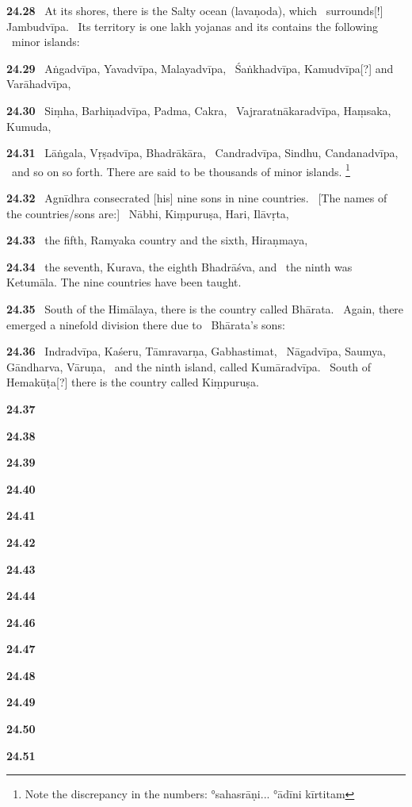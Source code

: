 \documentclass{article}
\begin{document}
\textbf{24.28}%
\ At its shores, there is the Salty ocean (lavaṇoda), which%
\              surrounds[!] Jambudvīpa.%
\ Its territory is one lakh yojanas and its contains the following%
\              minor islands:%


\textbf{24.29}%
\ Aṅgadvīpa, Yavadvīpa, Malayadvīpa,%
\ Śaṅkhadvīpa, Kamudvīpa[?] and Varāhadvīpa,%


\textbf{24.30}%
\ Siṃha, Barhiṇadvīpa, Padma, Cakra,%
\ Vajraratnākaradvīpa, Haṃsaka, Kumuda,%


\textbf{24.31}%
\ Lāṅgala, Vṛṣadvīpa, Bhadrākāra,%
\ Candradvīpa, Sindhu, Candanadvīpa,%
\ and so on so forth. There are said to be thousands of minor islands.%
\footnote{Note the discrepancy in the numbers: °sahasrāṇi... °ādīni kīrtitam  }%


\textbf{24.32}%
\ Agnīdhra consecrated [his] nine sons in nine countries.%
\ [The names of the countries/sons are:]%
\              Nābhi, Kiṃpuruṣa, Hari, Ilāvṛta,%


\textbf{24.33}%
\ the fifth, Ramyaka country and the sixth, Hiraṇmaya,%


\textbf{24.34}%
\ the seventh, Kurava, the eighth Bhadrāśva, and%
\                 the ninth was Ketumāla. The nine countries have been taught.%


\textbf{24.35}%
\ South of the Himālaya, there is the country called Bhārata.%
\                Again, there emerged a ninefold division there due to%
\                Bhārata's sons:%


\textbf{24.36}%
\ Indradvīpa, Kaśeru, Tāmravarṇa, Gabhastimat,%
\              Nāgadvīpa, Saumya, Gāndharva, Vāruṇa,%
\ and the ninth island, called Kumāradvīpa.%
\             South of Hemakūṭa[?] there is the country called Kiṃpuruṣa.%


\textbf{24.37}%


\textbf{24.38}%


\textbf{24.39}%


\textbf{24.40}%


\textbf{24.41}%


\textbf{24.42}%


\textbf{24.43}%


\textbf{24.44}%


\textbf{24.46}%


\textbf{24.47}%


\textbf{24.48}%


\textbf{24.49}%


\textbf{24.50}%


\textbf{24.51}%
\end{document}
